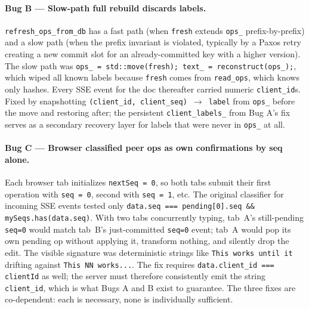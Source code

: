 \documentclass[11pt]{article}
\newcommand{\code}[1]{\texttt{#1}}
\begin{document}
\paragraph{Bug B --- Slow-path full rebuild discards labels.}
\code{refresh\_ops\_from\_db} has a fast path (when \code{fresh} extends \code{ops\_} prefix-by-prefix) and a slow path (when the prefix invariant is violated, typically by a Paxos retry creating a new commit slot for an already-committed key with a higher version). The slow path was \code{ops\_ = std::move(fresh); text\_ = reconstruct(ops\_);}, which wiped all known labels because \code{fresh} comes from \code{read\_ops}, which knows only hashes. Every SSE event for the doc thereafter carried numeric \code{client\_id}s. Fixed by snapshotting \code{(client\_id, client\_seq) $\rightarrow$ label} from \code{ops\_} before the move and restoring after; the persistent \code{client\_labels\_} from Bug A's fix serves as a secondary recovery layer for labels that were never in \code{ops\_} at all.

\paragraph{Bug C --- Browser classified peer ops as own confirmations by seq alone.}
Each browser tab initializes \code{nextSeq = 0}, so both tabs submit their first operation with \code{seq = 0}, second with \code{seq = 1}, etc. The original classifier for incoming SSE events tested only \code{data.seq === pending[0].seq \&\& mySeqs.has(data.seq)}. With two tabs concurrently typing, tab~A's still-pending \code{seq=0} would match tab~B's just-committed \code{seq=0} event; tab~A would pop its own pending op without applying it, transform nothing, and silently drop the edit. The visible signature was deterministic strings like \code{This works until it} drifting against \code{This NN works...}. The fix requires \code{data.client\_id === clientId} as well; the server must therefore consistently emit the string \code{client\_id}, which is what Bugs A and B exist to guarantee. The three fixes are co-dependent: each is necessary, none is individually sufficient.
\end{document}
